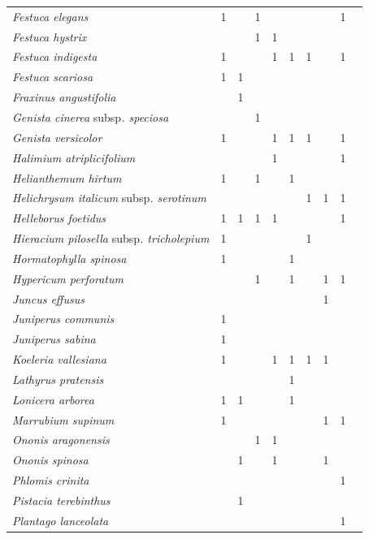 {\begin{longtable}{llllllllll}
\textit{Festuca elegans}  & 1 &  & 1 &  &  &  &  & 1 \\
\textit{Festuca hystrix}  &  &  & 1 & 1 &  &  &  &  \\
\textit{Festuca indigesta}  & 1 &  &  & 1 & 1 & 1 &  & 1 \\
\textit{Festuca scariosa}  & 1 & 1 &  &  &  &  &  &  \\
\textit{Fraxinus angustifolia}  &  & 1 &  &  &  &  &  &  \\
\textit{Genista cinerea }subsp\textit{. speciosa}  &  &  & 1 &  &  &  &  &  \\
\textit{Genista versicolor}  & 1 &  &  & 1 & 1 & 1 &  & 1 \\
\textit{Halimium atriplicifolium}  &  &  &  & 1 &  &  &  & 1 \\
\textit{Helianthemum hirtum}  & 1 &  & 1 &  & 1 &  &  &  \\
\textit{Helichrysum italicum }subsp\textit{. serotinum}  &  &  &  &  &  & 1 & 1 & 1 \\
\textit{Helleborus foetidus}  & 1 & 1 & 1 & 1 &  &  &  & 1 \\
\textit{Hieracium pilosella }subsp\textit{. tricholepium}  & 1 &  &  &  &  & 1 &  &  \\
\textit{Hormatophylla spinosa}  & 1 &  &  &  & 1 &  &  &  \\
\textit{Hypericum perforatum}  &  &  & 1 &  & 1 &  & 1 & 1 \\
\textit{Juncus effusus}  &  &  &  &  &  &  & 1 &  \\
\textit{Juniperus communis}  & 1 &  &  &  &  &  &  &  \\
\textit{Juniperus sabina}  & 1 &  &  &  &  &  &  &  \\
\textit{Koeleria vallesiana}  & 1 &  &  & 1 & 1 & 1 & 1 &  \\
\textit{Lathyrus pratensis}  &  &  &  &  & 1 &  &  &  \\
\textit{Lonicera arborea}  & 1 & 1 &  &  & 1 &  &  &  \\
\textit{Marrubium supinum}  & 1 &  &  &  &  &  & 1 & 1 \\
\textit{Ononis aragonensis}  &  &  & 1 & 1 &  &  &  &  \\
\textit{Ononis spinosa}  &  & 1 &  & 1 &  &  & 1 &  \\
\textit{Phlomis crinita}  &  &  &  &  &  &  &  & 1 \\
\textit{Pistacia terebinthus}  &  & 1 &  &  &  &  &  &  \\
\textit{Plantago lanceolata}  &  &  &  &  &  &  &  & 1 \\

\end{longtable}}
